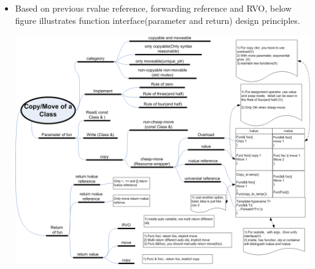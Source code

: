 \documentclass[a4paper,11pt,twoside]{book}
\begin{document}
\begin{itemize}
		\item Based on previous rvalue reference, forwarding reference and RVO, below figure illustrates function interface(parameter and return) design principles.
	\begin{center}
		\includegraphics[width=1.0\linewidth]{pics/move.png}
	\end{center}

\end{itemize}

	


\end{document}
